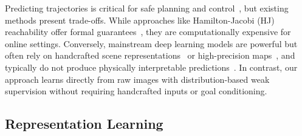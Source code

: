 \documentclass[nonacm,sigconf]{acmart}
\begin{document}
Predicting trajectories is critical for safe planning and control~\cite[]{fridovich2020confidence}, but existing methods present trade-offs. While approaches like Hamilton-Jacobi (HJ) reachability offer formal guarantees~\cite[]{li2021prediction,nakamura2023online}, they are computationally expensive for online settings. Conversely, mainstream deep learning models are powerful but often rely on handcrafted scene representations~\cite[]{salzmann2020trajectron++} or high-precision maps~\cite[]{itkina2023interpretable, hsu2023interpretable}, and typically do not produce physically interpretable predictions~\cite[]{lu2024towards, lindemann2023conformal, ruchkin2022confidence}. In contrast, our approach learns directly from raw images with distribution-based weak supervision without requiring handcrafted inputs or goal conditioning.




\subsection{Representation Learning}
\end{document}
